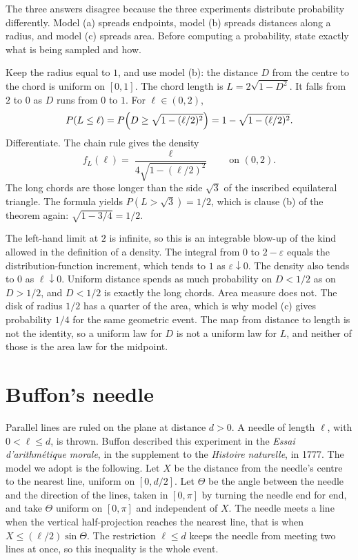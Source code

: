 The three answers disagree because the three experiments distribute probability differently. Model (a) spreads endpoints, model (b) spreads distances along a radius, and model (c) spreads area. Before computing a probability, state exactly what is being sampled and how.

\begin{examplex}
Keep the radius equal to $1$, and use model (b): the distance $D$ from the centre to the chord is uniform on $[0,1]$. The chord length is $L=2\sqrt{1-D^2}$. It falls from $2$ to $0$ as $D$ runs from $0$ to $1$. For $\ell\in(0,2)$,
\[
 P(L\le\ell)=P\Bigl(D\ge\sqrt{1-(\ell/2)^2}\Bigr)=1-\sqrt{1-(\ell/2)^2}.
\]
Differentiate. The chain rule gives the density
\[
 f_L(\ell)=\frac{\ell}{4\sqrt{1-(\ell/2)^2}}\qquad\text{on }(0,2).
\]
The long chords are those longer than the side $\sqrt3$ of the inscribed equilateral triangle. The formula yields $P(L>\sqrt3)=1/2$, which is clause (b) of the theorem again: $\sqrt{1-3/4}=1/2$.

The left-hand limit at $2$ is infinite, so this is an integrable blow-up of the kind allowed in the definition of a density. The integral from $0$ to $2-\varepsilon$ equals the distribution-function increment, which tends to $1$ as $\varepsilon\downarrow0$. The density also tends to $0$ as $\ell\downarrow0$. Uniform distance spends as much probability on $D<1/2$ as on $D>1/2$, and $D<1/2$ is exactly the long chords. Area measure does not. The disk of radius $1/2$ has a quarter of the area, which is why model (c) gives probability $1/4$ for the same geometric event. The map from distance to length is not the identity, so a uniform law for $D$ is not a uniform law for $L$, and neither of those is the area law for the midpoint.
\end{examplex}

\section{Buffon's needle}

Parallel lines are ruled on the plane at distance $d>0$. A needle of length $\ell$, with $0<\ell\le d$, is thrown. Buffon described this experiment in the \emph{Essai d'arithm\'etique morale}, in the supplement to the \emph{Histoire naturelle}, in 1777. The model we adopt is the following. Let $X$ be the distance from the needle's centre to the nearest line, uniform on $[0,d/2]$. Let $\Theta$ be the angle between the needle and the direction of the lines, taken in $[0,\pi]$ by turning the needle end for end, and take $\Theta$ uniform on $[0,\pi]$ and independent of $X$. The needle meets a line when the vertical half-projection reaches the nearest line, that is when $X\le(\ell/2)\sin\Theta$. The restriction $\ell\le d$ keeps the needle from meeting two lines at once, so this inequality is the whole event.

